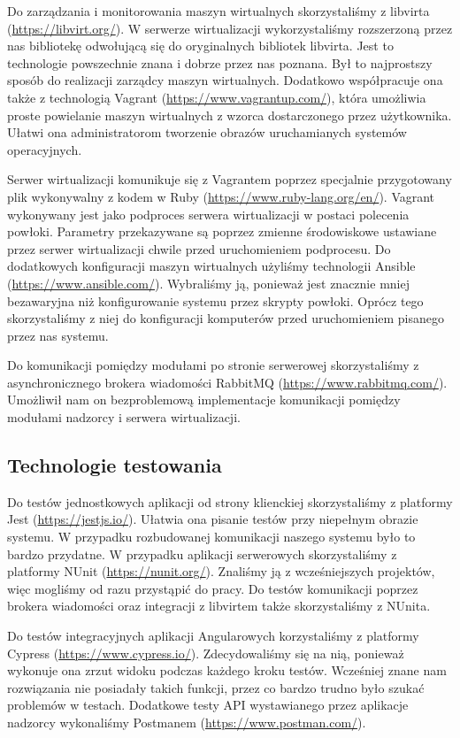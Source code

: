 \documentclass[../opis-rozwiazania.tex]{subfiles}
\begin{document}
Do zarządzania i monitorowania maszyn wirtualnych skorzystaliśmy z libvirta (\url{https://libvirt.org/}).
W serwerze wirtualizacji wykorzystaliśmy rozszerzoną przez nas bibliotekę odwołującą się do oryginalnych bibliotek libvirta.
Jest to technologie powszechnie znana i dobrze przez nas poznana. Był to najprostszy sposób do realizacji zarządcy maszyn wirtualnych.
Dodatkowo współpracuje ona także z technologią Vagrant (\url{https://www.vagrantup.com/}), która umożliwia proste powielanie maszyn wirtualnych z wzorca dostarczonego przez użytkownika.
Ułatwi ona administratorom tworzenie obrazów uruchamianych systemów operacyjnych.

Serwer wirtualizacji komunikuje się z Vagrantem poprzez specjalnie przygotowany plik wykonywalny z kodem w Ruby (\url{https://www.ruby-lang.org/en/}).
Vagrant wykonywany jest jako podproces serwera wirtualizacji w postaci polecenia powłoki.
Parametry przekazywane są poprzez zmienne środowiskowe ustawiane przez serwer wirtualizacji chwile przed uruchomieniem podprocesu.
Do dodatkowych konfiguracji maszyn wirtualnych użyliśmy technologii Ansible (\url{https://www.ansible.com/}).
Wybraliśmy ją, ponieważ jest znacznie mniej bezawaryjna niż konfigurowanie systemu przez skrypty powłoki.
Oprócz tego skorzystaliśmy z niej do konfiguracji komputerów przed uruchomieniem pisanego przez nas systemu.

Do komunikacji pomiędzy modułami po stronie serwerowej skorzystaliśmy z asynchronicznego brokera wiadomości RabbitMQ (\url{https://www.rabbitmq.com/}).
Umożliwił nam on bezproblemową implementacje komunikacji pomiędzy modułami nadzorcy i serwera wirtualizacji.

\subsection{Technologie testowania}
Do testów jednostkowych aplikacji od strony klienckiej skorzystaliśmy z platformy Jest (\url{https://jestjs.io/}).
Ułatwia ona pisanie testów przy niepełnym obrazie systemu. W przypadku rozbudowanej komunikacji naszego systemu było to bardzo przydatne.
W przypadku aplikacji serwerowych skorzystaliśmy z platformy NUnit (\url{https://nunit.org/}).
Znaliśmy ją z wcześniejszych projektów, więc mogliśmy od razu przystąpić do pracy.
Do testów komunikacji poprzez brokera wiadomości oraz integracji z libvirtem także skorzystaliśmy z NUnita.

Do testów integracyjnych aplikacji Angularowych korzystaliśmy z platformy Cypress (\url{https://www.cypress.io/}).
Zdecydowaliśmy się na nią, ponieważ wykonuje ona zrzut widoku podczas każdego kroku testów.
Wcześniej znane nam rozwiązania nie posiadały takich funkcji, przez co bardzo trudno było szukać problemów w testach.
Dodatkowe testy API wystawianego przez aplikacje nadzorcy wykonaliśmy Postmanem (\url{https://www.postman.com/}).
\end{document}
